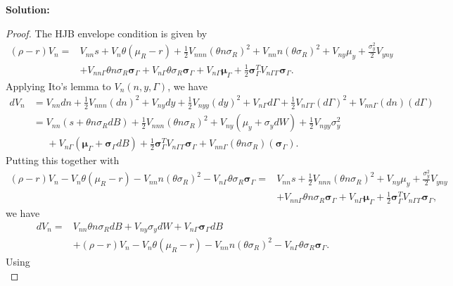 \documentclass[11pt]{extarticle}
\theoremstyle{plain}
\theoremstyle{definition}
\begin{document}
\begin{enumerate}[(a)]
\textbf{Solution:}

\vspace{2mm}
\noindent
\begin{proof}
	
	The HJB envelope condition is given by
	\begin{align*}
		(\rho - r) V_n = & V_{nn} s + V_n  \theta (\mu_R - r) + \frac{1}{2} V_{nnn} (\theta n \sigma_R )^2 +  V_{nn} n (\theta \sigma_R )^2  + V_{ny} \mu_y + \frac{\sigma_y^2}{2} V_{yny} \\
		& + V_{nn \Gamma} \theta n \sigma_R  \bm \sigma_\Gamma + V_{n \Gamma} \theta \sigma_R  \bm \sigma_\Gamma  + V_{n\Gamma} \bm \mu_\Gamma  + \frac{1}{2} \bm \sigma_\Gamma^T V_{ n \Gamma \Gamma} \bm \sigma_\Gamma.
	\end{align*}
	Applying Ito's lemma to $V_n(n, y, \Gamma)$, we have 
	\begin{align*}
		dV_n &= V_{nn} dn + \frac{1}{2} V_{nnn} (dn)^2 + V_{ny} dy + \frac{1}{2} V_{nyy} (dy)^2 + V_{n \Gamma} d\Gamma + \frac{1}{2} V_{n\Gamma \Gamma} (d\Gamma)^2  + V_{nn \Gamma} (dn) ( d \Gamma) \\
		&= V_{nn} (s + \theta n \sigma_R dB) + \frac{1}{2} V_{nnn} (\theta n \sigma_R)^2 + V_{ny} (\mu_y + \sigma_y dW) + \frac{1}{2} V_{nyy} \sigma_y^2 \\
		& \;\;\;\;\; + V_{n \Gamma} (\bm \mu_\Gamma + \bm \sigma_\Gamma dB ) + \frac{1}{2} \bm{\sigma}_\Gamma^T V_{n\Gamma \Gamma} \bm \sigma_\Gamma  + V_{nn \Gamma} (\theta n \sigma_R) ( \bm{\sigma}_\Gamma).
	\end{align*}
	Putting this together with 
	\begin{align*}
		(\rho - r) V_n - V_n  \theta (\mu_R - r) -  V_{nn} n (\theta \sigma_R )^2 - V_{n \Gamma} \theta \sigma_R  \bm \sigma_\Gamma  = & V_{nn} s + \frac{1}{2} V_{nnn} (\theta n \sigma_R )^2  + V_{ny} \mu_y + \frac{\sigma_y^2}{2} V_{yny} \\
		& + V_{nn \Gamma} \theta n \sigma_R  \bm \sigma_\Gamma + V_{n\Gamma} \bm \mu_\Gamma  + \frac{1}{2} \bm \sigma_\Gamma^T V_{ n \Gamma \Gamma} \bm \sigma_\Gamma,
	\end{align*}
	we have 
	\begin{align*}
		dV_n = &V_{nn} \theta n \sigma_R dB + V_{ny} \sigma_y dW + V_{n \Gamma}  \bm \sigma_\Gamma dB  \\
		&  + (\rho - r) V_n - V_n  \theta (\mu_R - r) -  V_{nn} n (\theta \sigma_R )^2 - V_{n \Gamma} \theta \sigma_R  \bm \sigma_\Gamma. 
	\end{align*}
	Using 
	\begin{equation*}

\end{equation*}
\end{proof}
\end{enumerate}
\end{document}
